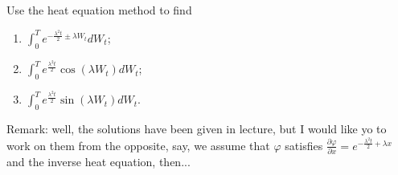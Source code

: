     \problem
    \begin{question}
    Use the heat equation method to find
    \begin{enumerate}[label=(\alph*)]
    \item $\int_0^T e^{-\frac{\lambda^2 t}{2}\pm \lambda W_t}dW_t$;
    \item $\int_0^T e^{\frac{\lambda^2 t}{2}} \cos (\lambda W_t)dW_t$;
    \item $\int_0^T e^{\frac{\lambda^2 t}{2}} \sin (\lambda W_t)dW_t$.
    \end{enumerate}
    Remark: well, the solutions have been given in lecture, but I would like yo to work on them from the opposite, say, we assume that $\varphi$ satisfies $\frac{\partial \varphi}{\partial x}=e^{-\frac{\lambda^2 t}{2}+\lambda x}$ and the inverse heat equation, then...
    \end{question}
